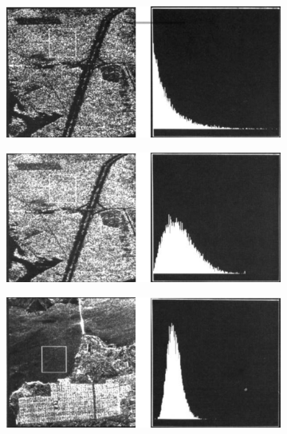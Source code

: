\begin{figure}
\label{fig:statistics}
 \centering
        \begin{subfigure}[b]{0.65\textwidth}
                \includegraphics[width=\textwidth]{Figures/lee1}
                \caption{}
                \label{fig:stat1}
        \end{subfigure}%
        \hspace{0.1em}
        \begin{subfigure}[b]{0.65\textwidth}
                \includegraphics[width=\textwidth]{Figures/lee2}
                \caption{}
                \label{fig:stat2}
        \end{subfigure}%
        \hspace{0.1em}
        \begin{subfigure}[b]{0.65\textwidth}
                \includegraphics[width=\textwidth]{Figures/lee3}
                \caption{}
                \label{fig:stat3}
        \end{subfigure}%


\end{figure}

